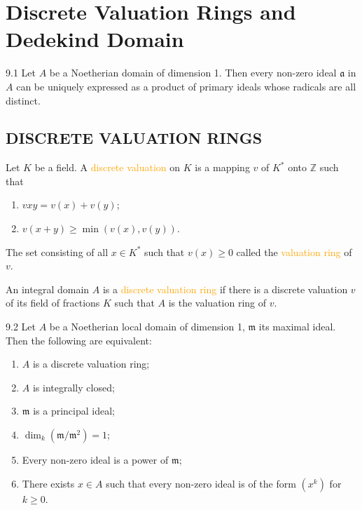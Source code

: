 \chapter{Discrete Valuation Rings and Dedekind Domain}

\begin{proposition}{9.1}
	Let $A$ be a Noetherian domain of dimension 1. Then every non-zero ideal $\mathfrak{a}$ in $A$ can be uniquely expressed as a product of primary ideals whose radicals are all distinct.
\end{proposition}

\section*{DISCRETE VALUATION RINGS}

Let $K$ be a field. A \textcolor{orange}{discrete valuation} on $K$ is a mapping $v$ of $K^*$ onto $\mathbb{Z}$ such that
\begin{enumerate}[label=\textup{(\arabic*)}]
	\item $v{xy}=v(x)+v(y)$;
	\item $v(x+y)\geqslant\min\left(v(x),v(y)\right)$.
\end{enumerate}
The set consisting of all $x\in K^*$ such that $v(x)\geqslant0$ called the \textcolor{orange}{valuation ring} of $v$.

An integral domain $A$ is a \textcolor{orange}{discrete valuation ring} if there is a discrete valuation $v$ of its field of fractions $K$ such that $A$ is the valuation ring of $v$.

\begin{proposition}{9.2}
	Let $A$ be a Noetherian local domain of dimension 1, $\mathfrak{m}$ its maximal ideal. Then the following are equivalent:
	\begin{enumerate}[label=\textup{(\roman*)},ref=\thepropositiontemp(\roman*)]
		\item\label{9.2.1} $A$ is a discrete valuation ring;
		\item\label{9.2.2} $A$ is integrally closed;
		\item\label{9.2.3} $\mathfrak{m}$ is a principal ideal;
		\item\label{9.2.4} $\dim_k\left(\mathfrak{m}/\mathfrak{m}^2\right)=1$;
		\item\label{9.2.5} Every non-zero ideal is a power of $\mathfrak{m}$;
		\item\label{9.2.6} There exists $x\in A$ such that every non-zero ideal is of the form $\left(x^k\right)$ for $k\geqslant0$.
	\end{enumerate}
\end{proposition}

